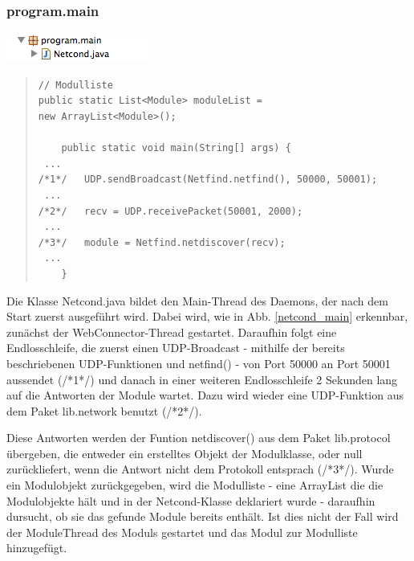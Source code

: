 \documentclass[a4paper,14pt,headsepline]{scrartcl}
\begin{document}
\newpage

\subsubsection*{program.main}

\includegraphics[width=0.24 \paperwidth]{./bilder/lib_main.png}

\begin{quote}
\begin{verbatim}
// Modulliste
public static List<Module> moduleList = 
new ArrayList<Module>();	
	
	public static void main(String[] args) {
 ...
/*1*/   UDP.sendBroadcast(Netfind.netfind(), 50000, 50001);
 ...
/*2*/   recv = UDP.receivePacket(50001, 2000);
 ...
/*3*/   module = Netfind.netdiscover(recv);
 ...
	}
\end{verbatim}
\end{quote} 

Die Klasse Netcond.java bildet den Main-Thread des Daemons, der nach dem Start zuerst ausgeführt wird. Dabei wird, wie in Abb. \ref{netcond_main} erkennbar, zunächst der WebConnector-Thread gestartet. Daraufhin folgt eine Endlosschleife, die zuerst einen UDP-Broadcast - mithilfe der bereits beschriebenen UDP-Funktionen und netfind() - von Port 50000 an Port 50001 aussendet (/*1*/) und danach in einer weiteren Endlosschleife 2 Sekunden lang auf die Antworten der Module wartet. Dazu wird wieder eine UDP-Funktion aus dem Paket lib.network benutzt (/*2*/). 

\newpage

Diese Antworten werden der Funtion netdiscover() aus dem Paket lib.protocol übergeben, die entweder ein erstelltes Objekt der Modulklasse, oder null \linebreak zurückliefert, wenn die Antwort nicht dem Protokoll entsprach (/*3*/). Wurde ein Modulobjekt zurückgegeben, wird die Modulliste - eine ArrayList die die Modulobjekte hält und in der Netcond-Klasse deklariert wurde - daraufhin dursucht, ob sie das gefunde Module bereits enthält. Ist dies nicht der Fall wird der ModuleThread des Moduls gestartet und das Modul zur Modulliste hinzugefügt. 
\end{document}

